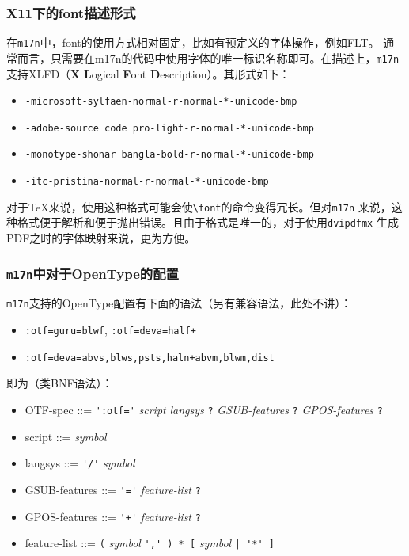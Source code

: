 \documentclass[dvipdfmx]{beamer}
\begin{document}
%
\begin{frame}[fragile]
\frametitle{X11下的font描述形式}
在\texttt{m17n}中，font的使用方式相对固定，比如有预定义的字体操作，例如FLT。
通常而言，只需要在m17n的代码中使用字体的唯一标识名称即可。在描述上，\texttt{m17n}
支持XLFD（{\bf X} {\bf L}ogical {\bf F}ont {\bf D}escription）。其形式如下：

\begin{itemize}
\item \verb!-microsoft-sylfaen-normal-r-normal-*-unicode-bmp!
\item \verb!-adobe-source code pro-light-r-normal-*-unicode-bmp!
\item \verb!-monotype-shonar bangla-bold-r-normal-*-unicode-bmp!
\item \verb!-itc-pristina-normal-r-normal-*-unicode-bmp!
\end{itemize}

对于\TeX 来说，使用这种格式可能会使\verb!\font!的命令变得冗长。但对\texttt{m17n}
来说，这种格式便于解析和便于抛出错误。且由于格式是唯一的，对于使用\texttt{dvipdfmx}
生成PDF之时的字体映射来说，更为方便。
\end{frame}
%
\begin{frame}[fragile]
\frametitle{\texttt{m17n}中对于OpenType的配置}
\texttt{m17n}支持的OpenType配置有下面的语法（另有兼容语法，此处不讲）：
\begin{itemize}
\item \verb!:otf=guru=blwf!, \verb!:otf=deva=half+!
\item \verb!:otf=deva=abvs,blws,psts,haln+abvm,blwm,dist!
\end{itemize}
即为（类BNF语法）：
\begin{itemize}
\item OTF-spec ::= \verb!':otf='! \textit{script} \textit{langsys} \verb!?!
\textit{GSUB-features} \verb!?! \textit{GPOS-features} \verb!?!
\item script ::= \textit{symbol}
\item langsys ::= \verb!'/'! \textit{symbol}
\item GSUB-features ::= \verb!'='! \textit{feature-list} \verb!?!
\item GPOS-features ::= \verb!'+'! \textit{feature-list} \verb!?!
\item feature-list ::= \verb!(! \textit{symbol} \verb!',' ) * [! \textit{symbol} \verb!| '*' ]!
\end{itemize}
\end{frame}
%
\end{document}
